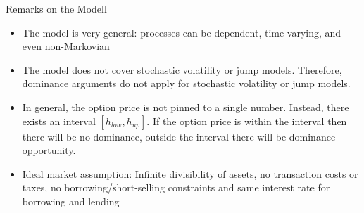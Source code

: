 \documentclass{beamer}
\begin{document}
\begin{frame}{Remarks on the Modell}

    {\footnotesize \footnotesize
    \begin{itemize}
        \item The model is very general: processes can be dependent, time-varying, and even non-Markovian
        \vspace{1em}
        \item The model does not cover stochastic volatility or jump models. 
        Therefore, dominance arguments do not apply for stochastic volatility or jump models.
        \vspace{1em}
        \item In general, the option price is not pinned to a single number. Instead, there exists an interval $[h_{low},h_{up}]$.
        If the option price is within the interval then there will be no dominance, outside the interval there will be dominance opportunity.
        \vspace{1em}
        \item Ideal market assumption: Infinite divisibility of assets, no transaction costs or taxes, no borrowing/short-selling constraints 
        and same interest rate for borrowing and lending
    \end{itemize}
    }   
\end{frame}
\end{document}
